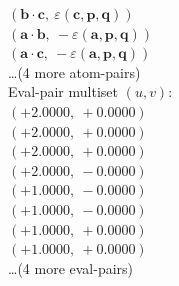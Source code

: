 \documentclass[a4paper,11pt]{article}
\newcommand{\pdcegfomjfhook}[2]{\mathbf{#1} \cdot \mathbf{#2}}
\newcommand{\kblbmcpggoncpf}[3]{\varepsilon(\mathbf{#1},\mathbf{#2},\mathbf{#3})}
\begin{document}
$(\pdcegfomjfhook{b}{c},\ \kblbmcpggoncpf{c}{p}{q})$\\
$(\pdcegfomjfhook{a}{b},\ -\kblbmcpggoncpf{a}{p}{q})$\\
$(\pdcegfomjfhook{a}{c},\ -\kblbmcpggoncpf{a}{p}{q})$\\
\quad \ldots (4 more atom-pairs)\\
\quad Eval-pair multiset $(u, v)$:\\
$(+2.0000,\ +0.0000)$\\
$(+2.0000,\ +0.0000)$\\
$(+2.0000,\ +0.0000)$\\
$(+2.0000,\ -0.0000)$\\
$(+1.0000,\ -0.0000)$\\
$(+1.0000,\ -0.0000)$\\
$(+1.0000,\ +0.0000)$\\
$(+1.0000,\ +0.0000)$\\
\quad \ldots (4 more eval-pairs)\\
\end{document}
